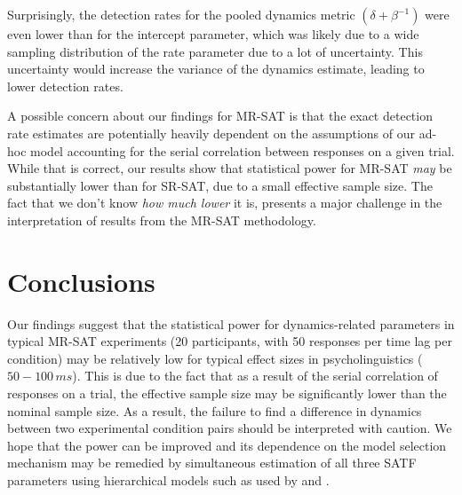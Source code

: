 \documentclass[10pt,letterpaper]{article}
\begin{document}
Surprisingly, the detection rates for the pooled dynamics metric $(\delta+\beta^{-1})$ were even lower than for the intercept parameter, which was likely due to a wide sampling distribution of the rate parameter due to a lot of uncertainty. This uncertainty would increase the variance of the dynamics estimate, leading to lower detection rates.

A possible concern about our findings for MR-SAT is that the exact detection rate estimates are potentially heavily dependent on the assumptions of our ad-hoc model accounting for the serial correlation between responses on a given trial. While that is correct, our results show that statistical power for MR-SAT \textit{may} be substantially lower than for SR-SAT, due to a small effective sample size. The fact that we don't know \textit{how much lower} it is, presents a major challenge in the interpretation of results from the MR-SAT methodology. 






\section{Conclusions}\label{conclusions}

Our findings suggest that the statistical power for dynamics-related parameters in typical MR-SAT experiments (20 participants, with 50 responses per time lag per condition) may be relatively low for typical effect sizes in psycholinguistics ($50-100\,ms$). This is due to the fact that as a result of the serial correlation of responses on a trial, the effective sample size may be significantly lower than the nominal sample size.
As a result, the failure to find a difference in dynamics between two experimental condition pairs should be interpreted with caution.
We hope that the power can be improved and its dependence on the model selection mechanism may be remedied by simultaneous estimation of all three SATF parameters using hierarchical models such as used by  and .
\end{document}
